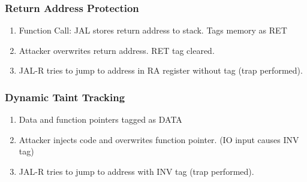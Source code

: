 \documentclass{beamer}
\begin{document}
\begin{frame}
	\frametitle{Return Address Protection}
	\begin{enumerate}
	\item Function Call: JAL stores return address to stack. Tags memory as RET
	\item Attacker overwrites return address. RET tag cleared.
	\item JAL-R tries to jump to address in RA register without tag (trap performed).
	\end{enumerate}
	\begin{figure}[!h]
		\begin{center}
	\end{center}
	\end{figure}
\end{frame}

\begin{frame}
	\frametitle{Dynamic Taint Tracking}
	\begin{enumerate}
	\item Data and function pointers tagged as DATA
	\item Attacker injects code and overwrites function pointer. (IO input causes INV tag)
	\item JAL-R tries to jump to address with INV tag (trap performed).
	\end{enumerate}
	\begin{figure}[!h]
		\begin{center}
	\end{center}
	\end{figure}
\end{frame}
\end{document}
